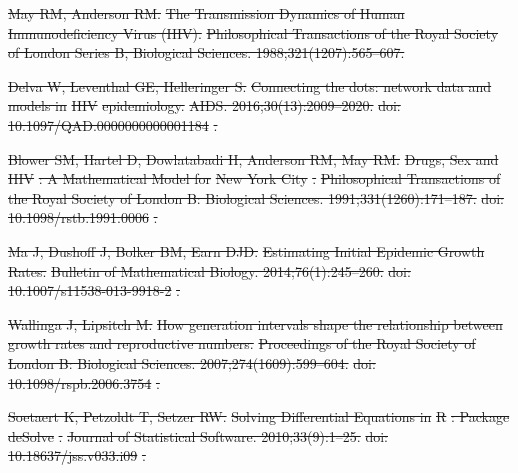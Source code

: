 \documentclass[10pt,letterpaper]{article}
\providecommand{\DIFdeltex}[1]{{\protect\color{red}\sout{#1}}}                      %
\providecommand{\DIFdel}[1]{\texorpdfstring{\DIFdeltex{#1}}{}} %
\begin{document}
\DIFdel{May RM, Anderson RM.
}%
\DIFdel{The Transmission Dynamics of Human Immunodeficiency Virus (HIV).
}%
\DIFdel{Philosophical Transactions of the Royal Society of London Series B,
  Biological Sciences. 1988;321(1207):565--607.
}%

\DIFdel{Delva W, Leventhal GE, Helleringer S.
}%
\DIFdel{Connecting the dots: network data and models in }%
\DIFdel{HIV}%
\DIFdel{epidemiology.
}%
\DIFdel{AIDS. 2016;30(13):2009--2020.
}%
\DIFdel{doi:}%
\DIFdel{10.1097/QAD.0000000000001184}%
\DIFdel{.
}%

\DIFdel{Blower SM, Hartel D, Dowlatabadi H, Anderson RM, May RM.
}%
\DIFdel{Drugs, Sex and }%
\DIFdel{HIV}%
\DIFdel{: A Mathematical Model for }%
\DIFdel{New York City}%
\DIFdel{.
}%
\DIFdel{Philosophical Transactions of the Royal Society of London B:
  Biological Sciences. 1991;331(1260):171--187.
}%
\DIFdel{doi:}%
\DIFdel{10.1098/rstb.1991.0006}%
\DIFdel{.
}%

\DIFdel{Ma J, Dushoff J, Bolker BM, Earn DJD.
}%
\DIFdel{Estimating Initial Epidemic Growth Rates.
}%
\DIFdel{Bulletin of Mathematical Biology. 2014;76(1):245--260.
}%
\DIFdel{doi:}%
\DIFdel{10.1007/s11538-013-9918-2}%
\DIFdel{.
}%

\DIFdel{Wallinga J, Lipsitch M.
}%
\DIFdel{How generation intervals shape the relationship between growth rates
  and reproductive numbers.
}%
\DIFdel{Proceedings of the Royal Society of London B: Biological Sciences.
  2007;274(1609):599--604.
}%
\DIFdel{doi:}%
\DIFdel{10.1098/rspb.2006.3754}%
\DIFdel{.
}%

\DIFdel{Soetaert K, Petzoldt T, Setzer RW.
}%
\DIFdel{Solving Differential Equations in }%
\DIFdel{R}%
\DIFdel{: Package }%
\DIFdel{deSolve}%
\DIFdel{.
}%
\DIFdel{Journal of Statistical Software. 2010;33(9):1--25.
}%
\DIFdel{doi:}%
\DIFdel{10.18637/jss.v033.i09}%
\DIFdel{.
}%
\end{document}
